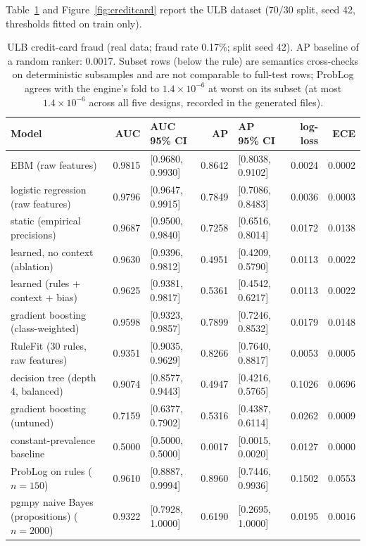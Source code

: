 Table~\ref{tab:creditcard} and Figure~\ref{fig:creditcard} report the
ULB dataset (70/30 split, seed 42, thresholds fitted on train only).

\begin{table}[t]
\centering
\caption{ULB credit-card fraud (real data; fraud rate 0.17\%; split seed
42). AP baseline of a random ranker: 0.0017. Subset rows (below the
rule) are semantics cross-checks on deterministic subsamples and are not
comparable to full-test rows; ProbLog agrees with the engine's fold to
$1.4\times10^{-6}$ at worst on its subset (at most $1.4\times10^{-6}$
across all five designs, recorded in the generated files).}
\label{tab:creditcard}
{\scriptsize
\setlength{\tabcolsep}{3.5pt}
\begin{tabular}{lrlrlrr}
\toprule
Model & AUC & AUC 95\% CI & AP & AP 95\% CI & log-loss & ECE\\
\midrule
EBM (raw features) & 0.9815 & [0.9680, 0.9930] & 0.8642 & [0.8038, 0.9102] & 0.0024 & 0.0002\\
logistic regression (raw features) & 0.9796 & [0.9647, 0.9915] & 0.7849 & [0.7086, 0.8483] & 0.0036 & 0.0003\\
\pla{} static (empirical precisions) & 0.9687 & [0.9500, 0.9840] & 0.7258 & [0.6516, 0.8014] & 0.0172 & 0.0138\\
\pla{} learned, no context (ablation) & 0.9630 & [0.9396, 0.9812] & 0.4951 & [0.4209, 0.5790] & 0.0113 & 0.0022\\
\pla{} learned (rules + context + bias) & 0.9625 & [0.9381, 0.9817] & 0.5361 & [0.4542, 0.6217] & 0.0113 & 0.0022\\
gradient boosting (class-weighted) & 0.9598 & [0.9323, 0.9857] & 0.7899 & [0.7246, 0.8532] & 0.0179 & 0.0148\\
RuleFit (30 rules, raw features) & 0.9351 & [0.9035, 0.9629] & 0.8266 & [0.7640, 0.8817] & 0.0053 & 0.0005\\
decision tree (depth 4, balanced) & 0.9074 & [0.8577, 0.9443] & 0.4947 & [0.4216, 0.5765] & 0.1026 & 0.0696\\
gradient boosting (untuned) & 0.7159 & [0.6377, 0.7902] & 0.5316 & [0.4387, 0.6114] & 0.0262 & 0.0009\\
constant-prevalence baseline & 0.5000 & [0.5000, 0.5000] & 0.0017 & [0.0015, 0.0020] & 0.0127 & 0.0000\\
\midrule
ProbLog on \pla{} rules ($n{=}150$) & 0.9610 & [0.8887, 0.9994] & 0.8960 & [0.7446, 0.9936] & 0.1502 & 0.0553\\
pgmpy naive Bayes (propositions) ($n{=}2000$) & 0.9322 & [0.7928, 1.0000] & 0.6190 & [0.2695, 1.0000] & 0.0195 & 0.0016\\
\bottomrule
\end{tabular}}
\end{table}

